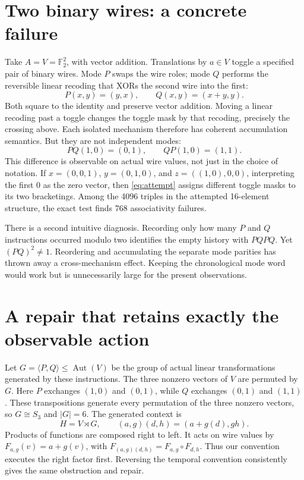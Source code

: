 \documentclass[11pt]{article}
\newcommand{\F}{\mathbb F}
\begin{document}
\section{Two binary wires: a concrete failure}
Take $A=V=\F_2^2$, with vector addition. Translations by $a\in V$
toggle a specified pair of binary wires. Mode $P$ swaps the wire roles;
mode $Q$ performs the reversible linear recoding that XORs the second wire
into the first:
\[
 P(x,y)=(y,x),\qquad Q(x,y)=(x+y,y).
\]
Both square to the identity and preserve vector addition. Moving a linear
recoding past a toggle changes the toggle mask by that recoding, precisely
the crossing above. Each isolated mechanism therefore has coherent
accumulation semantics. But they are not independent modes:
\[
 PQ(1,0)=(0,1),\qquad QP(1,0)=(1,1).
\]
This difference is observable on actual wire values, not just in the choice
of notation. If $x=(0,0,1)$, $y=(0,1,0)$, and
$z=((1,0),0,0)$, interpreting the first $0$ as the zero vector, then
\eqref{eq:attempt} assigns different toggle masks to its two bracketings.
Among the 4096 triples in the attempted 16-element structure, the exact
test finds 768 associativity failures.

There is a second intuitive diagnosis. Recording only how many $P$ and $Q$
instructions occurred modulo two identifies the empty history with $PQPQ$.
Yet $(PQ)^2\ne1$. Reordering and accumulating the separate mode parities
has thrown away a cross-mechanism effect. Keeping the chronological mode
word would work but is unnecessarily large for the present observations.

\section{A repair that retains exactly the observable action}
Let $G=\langle P,Q\rangle\leq\operatorname{Aut}(V)$ be the group of actual
linear transformations generated by these instructions. The three nonzero
vectors of $V$ are permuted by $G$. Here $P$ exchanges $(1,0)$ and $(0,1)$,
while $Q$ exchanges $(0,1)$ and $(1,1)$. These transpositions generate every
permutation of the three nonzero vectors, so $G\cong S_3$ and $|G|=6$.
The generated context is
\[
 H=V\rtimes G,\qquad (a,g)(d,h)=(a+g(d),gh).
\]
Products of functions are composed right to left. It acts on wire values by
$F_{a,g}(v)=a+g(v)$, with $F_{(a,g)(d,h)}=F_{a,g}\circ F_{d,h}$.
Thus our convention executes the right factor first. Reversing the temporal
convention consistently gives the same obstruction and repair.
\end{document}
